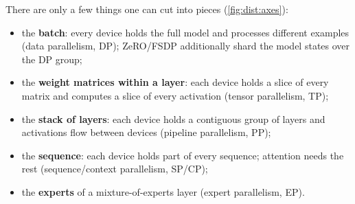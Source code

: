 There are only a few things one can cut into pieces (\cref{fig:dist:axes}):
\begin{itemize}
\item the \textbf{batch}: every device holds the full model and processes different examples
  (data parallelism, DP); ZeRO/FSDP additionally shard the model states over the DP group;
\item the \textbf{weight matrices within a layer}: each device holds a slice of every matrix
  and computes a slice of every activation (tensor parallelism, TP);
\item the \textbf{stack of layers}: each device holds a contiguous group of layers and
  activations flow between devices (pipeline parallelism, PP);
\item the \textbf{sequence}: each device holds part of every sequence; attention needs the rest
  (sequence/context parallelism, SP/CP);
\item the \textbf{experts} of a mixture-of-experts layer (expert parallelism, EP).
\end{itemize}

